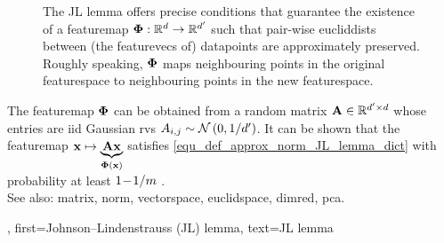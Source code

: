 {{\begin{figure}[hbtp]
		\caption{The JL lemma offers precise conditions that guarantee the existence of 
		         a \gls{featuremap} ${\bf \Phi}: \mathbb{R}^{d} \rightarrow \mathbb{R}^{d'}$ such that pair-wise \glspl{eucliddist} between (the \glspl{featurevec} of) \glspl{datapoint} are 
			approximately preserved. Roughly speaking, 
			${\bf \Phi}$ maps neighbouring points in the original \gls{featurespace} 
			to neighbouring points in the new \gls{featurespace}.}
	\end{figure}
	The \gls{featuremap} ${\bf \Phi}$ can be obtained from a random \gls{matrix} 
	${\bf A} \in \mathbb{R}^{d' \times d}$ whose entries are \gls{iid} 
	Gaussian \glspl{rv} $A_{i,j} \sim \mathcal{N}\left(0,1/d'\right)$. 
	It can be shown that the \gls{featuremap} ${\bf x} \mapsto \underbrace{{\bf A} {\bf x}}_{{\bf \Phi}({\bf x})}$ 
	satisfies \eqref{equ_def_approx_norm_JL_lemma_dict} with \gls{probability} at least $1\!-\!1/m$ \cite{ProofJLlemma}. \\
  See also: \gls{matrix}, \gls{norm}, \gls{vectorspace}, \gls{euclidspace}, \gls{dimred}, \gls{pca}.},
  first={Johnson--Lindenstrauss (JL) lemma},
  text={JL lemma}
}

